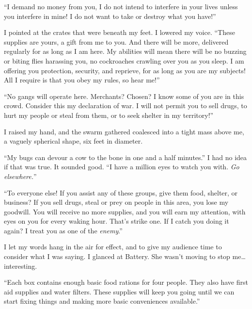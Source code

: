 ``I demand no money from you, I do not intend to interfere in your lives unless you interfere in mine!  I do not want to take or destroy what you have!''



I pointed at the crates that were beneath my feet.  I lowered my voice.  ``These supplies are yours, a gift from me to you.  And there will be more, delivered regularly for as long as I am here.  My abilities will mean there will be no buzzing or biting flies harassing you, no cockroaches crawling over you as you sleep.  I am offering you protection, security, and reprieve, for as long as you are my subjects!  All I require is that you obey my rules, so hear me!''



``No gangs will operate here.  Merchants?  Chosen?  I know some of you are in this crowd.  Consider this my declaration of war.  I will not permit you to sell drugs, to hurt my people or steal from them, or to seek shelter in my territory!''



I raised my hand, and the swarm gathered coalesced into a tight mass above me, a vaguely spherical shape, six feet in diameter.



``My bugs can devour a cow to the bone in one and a half minutes.''  I had no idea if that was true.  It sounded good.  ``I have a million eyes to watch you with.  \emph{Go elsewhere.}''



``To everyone else!  If you assist any of these groups, give them food, shelter, or business?  If you sell drugs, steal or prey on people in this area, you lose my goodwill.  You will receive no more supplies, and you will earn my attention, with eyes on you for every waking hour.  That's strike one.  If I catch you doing it again?  I treat you as one of the\emph{ enemy}.''



I let my words hang in the air for effect, and to give my audience time to consider what I was saying.  I glanced at Battery.  She wasn't moving to stop me\ldots interesting.



``Each box contains enough basic food rations for four people.  They also have first aid supplies and water filters.  These supplies will keep you going until we can start fixing things and making more basic conveniences available.''



